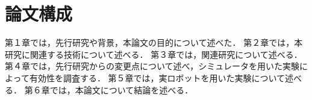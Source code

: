 \section{論文構成}
第１章では，先行研究や背景，本論文の目的について述べた．
第２章では，本研究に関連する技術について述べる．
第３章では，関連研究について述べる．
第４章では，先行研究からの変更点について述べ，シミュレータを用いた実験によって有効性を調査する．
第５章では，実ロボットを用いた実験について述べる．
第６章では，本論文について結論を述べる．
